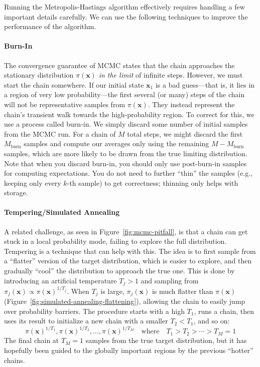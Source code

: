 Running the Metropolis-Hastings algorithm effectively requires handling a few important details carefully. We can use the following techniques to improve the performance of the algorithm.

\paragraph*{Burn-In}
The convergence guarantee of MCMC states that the chain approaches the stationary distribution $\pi(\mathbf{x})$ \emph{in the limit} of infinite steps. However, we must start the chain somewhere. If our initial state $\mathbf{x}_1$ is a bad guess---that is, it lies in a region of very low probability---the first several (or many) steps of the chain will not be representative samples from $\pi(\mathbf{x})$. They instead represent the chain's transient walk towards the high-probability region. To correct for this, we use a process called burn-in. We simply discard some number of initial samples from the MCMC run. For a chain of $M$ total steps, we might discard the first $M_{\text{burn}}$ samples and compute our averages only using the remaining $M - M_{\text{burn}}$ samples, which are more likely to be drawn from the true limiting distribution. Note that when you discard burn-in, you should only use post-burn-in samples for computing expectations. You do not need to further ``thin'' the samples (e.g., keeping only every $k$-th sample) to get correctness; thinning only helps with storage.

\paragraph*{Tempering/Simulated Annealing}
A related challenge, as seen in Figure~\ref{fig:mcmc-pitfall}, is that a chain can get stuck in a local probability mode, failing to explore the full distribution. Tempering is a technique that can help with this. The idea is to first sample from a ``flatter'' version of the target distribution, which is easier to explore, and then gradually ``cool'' the distribution to approach the true one. This is done by introducing an artificial temperature $T_j > 1$ and sampling from $\pi_j(\mathbf{x}) \propto \pi(\mathbf{x})^{1/T_j}$. When $T_j$ is large, $\pi_j(\mathbf{x})$ is much flatter than $\pi(\mathbf{x})$ (Figure~\ref{fig:simulated-annealing-flattening}), allowing the chain to easily jump over probability barriers. The procedure starts with a high $T_1$, runs a chain, then uses its result to initialize a new chain with a smaller $T_2 < T_1$, and so on:
\begin{equation}
    \pi(\mathbf{x})^{1/T_1}, \pi(\mathbf{x})^{1/T_2}, \ldots, \pi(\mathbf{x})^{1/T_M} \quad \text{where} \quad T_1 > T_2 > \cdots > T_M = 1
\end{equation}
The final chain at $T_M=1$ samples from the true target distribution, but it has hopefully been guided to the globally important regions by the previous ``hotter'' chains. 

